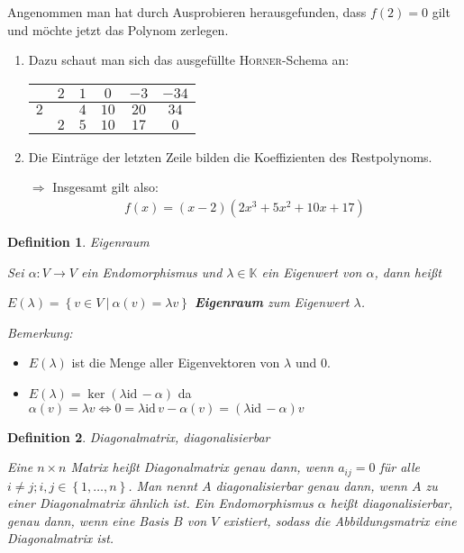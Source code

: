 \documentclass[%
a4paper,
11pt,		%
]
{scrartcl}
\newcommand{\K}{\mathbb{K}}
\newcommand{\id}{\text{id}\,}
\theoremstyle{plain}
\newtheorem{mydef}{Definition}[section]
\theoremstyle{plain}
\theoremstyle{plain}
\theoremstyle{plain}
\theoremstyle{plain}
\begin{document}
\begin{itemize}
        Angenommen man hat durch Ausprobieren herausgefunden, dass $f(2)=0$ gilt und möchte jetzt das Polynom zerlegen.
        \begin{enumerate}
            \item Dazu schaut man sich das ausgefüllte \textsc{Horner}-Schema an:
                \begin{center}
                    \begin{tabular}{c|ccccc}
                        & $2$   & $1$   & $0$   & $-3$  & $-34$ \\\hline
                        $2$     &       & $4 $  & $10$  & $20$  & $34$   \\\hline
                        & $2$   & $5$   & $10$  & $17$  & $0$
                    \end{tabular}
                \end{center}
            \item Die Einträge der letzten Zeile bilden die Koeffizienten des Restpolynoms.
            \item[$\Rightarrow$] Insgesamt gilt also:
                \begin{align*}
                    f(x) = (x-2)(2x^3+5x^2+10x+17)
                \end{align*}
        \end{enumerate}
\end{itemize}


\begin{mydef} \textit{Eigenraum}

    Sei $\alpha: V \to V$ ein Endomorphismus und $\lambda \in \K$ ein Eigenwert von $\alpha$, dann heißt

    $E(\lambda) = \left\{ v \in V\ |\ \alpha(v) = \lambda v \right\}$ \textbf{Eigenraum} zum Eigenwert $\lambda$.
\end{mydef}

\textit{Bemerkung:}
\begin{itemize}
    \item $E(\lambda)$ ist die Menge aller Eigenvektoren von $\lambda$ und $0$.
    \item $E(\lambda) = \ker(\lambda \id - \alpha)$ \hfill da $ \alpha(v) = \lambda v \Leftrightarrow 0 = \lambda \id v - \alpha(v) = (\lambda \id - \alpha) v$
\end{itemize}

\begin{mydef} \textit{Diagonalmatrix, diagonalisierbar}

    Eine $n \times n$ Matrix heißt Diagonalmatrix genau dann, wenn $a_{ij}=0$ für alle $i \neq j; i,j \in \left\{ 1,\dots,n \right\}$. Man nennt $A$ diagonalisierbar genau dann, wenn $A$ zu einer Diagonalmatrix ähnlich ist.
    Ein Endomorphismus $\alpha$ heißt diagonalisierbar, genau dann, wenn eine Basis $B$ von $V$ existiert, sodass die Abbildungsmatrix eine Diagonalmatrix ist.
\end{mydef}
\end{document}
